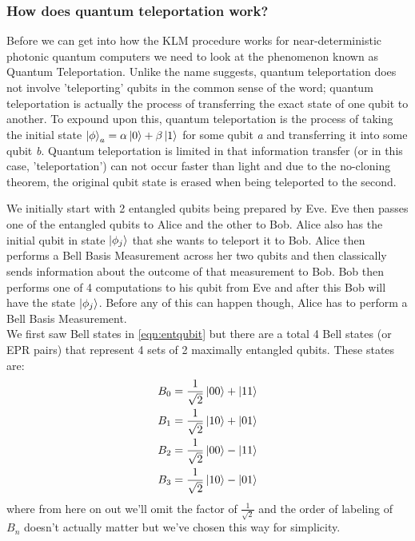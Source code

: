 \subsubsection{How does quantum teleportation work?}
Before we can get into how the KLM procedure works for near-deterministic photonic quantum computers we need to look at the phenomenon known as Quantum Teleportation. Unlike the name suggests, quantum teleportation does not involve 'teleporting' qubits in the common sense of the word; quantum teleportation is actually the process of transferring the exact state of one qubit to another. To expound upon this, quantum teleportation is the process of taking the initial state $\ket{\phi}_a = \alpha\ket{0} + \beta\ket{1}$ for some qubit \textit{a} and transferring it into some qubit \textit{b}. Quantum teleportation is limited in that information transfer (or in this case, 'teleportation') can not occur faster than light and due to the no-cloning theorem, the original qubit state is erased when being teleported to the second.
\par
We initially start with 2 entangled qubits being prepared by Eve. Eve then passes one of the entangled qubits to Alice and the other to Bob. Alice also has the initial qubit in state $\ket{\phi_j}$ that she wants to teleport it to Bob. Alice then performs a Bell Basis Measurement across her two qubits and then classically sends information about the outcome of that measurement to Bob. Bob then performs one of 4 computations to his qubit from Eve and after this Bob will have the state $\ket{\phi_j}$. Before any of this can happen though, Alice has to perform a Bell Basis Measurement. \\
We first saw Bell states in  \cref{eqn:entqubit} but there are a total 4 Bell states (or EPR pairs) that represent 4 sets of 2 maximally entangled qubits. These states are:
\begin{align}\label{eqn:Bell States}
    B_0 &= \frac{1}{\sqrt{2}}\ket{00} + \ket{11} \\
    B_1 &= \frac{1}{\sqrt{2}}\ket{10} + \ket{01} \\
    B_2 &= \frac{1}{\sqrt{2}}\ket{00} - \ket{11} \\
    B_3 &= \frac{1}{\sqrt{2}}\ket{10} - \ket{01} \\
\end{align} \cite{nielsen_chuang_2010}
where from here on out we'll omit the factor of $\frac{1}{\sqrt{2}}$ and the order of labeling of $B_n$ doesn't actually matter but we've chosen this way for simplicity. 
\par
